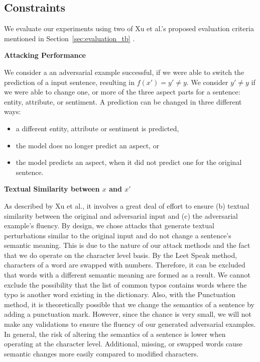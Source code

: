 \subsection{Constraints}
    \label{sec:constraints_m}

We evaluate our experiments using two of Xu et al.'s proposed evaluation criteria mentioned in Section~\ref{sec:evaluation_tb} \cite{xu2020elephant}. 

\textbf{Attacking Performance}

We consider a an adversarial example successful, if we were able to switch the prediction of a input sentence, resulting in ${f(x') = y' \neq y}$.
We consider ${y' \neq y}$ if we were able to change one, or more of the three aspect parts for a sentence: entity, attribute, or sentiment. 
A prediction can be changed in three different ways:
\begin{itemize}
\item a different entity, attribute or sentiment is predicted,
\item the model does no longer predict an aspect, or
\item the model predicts an aspect, when it did not predict one for the original sentence.
\end{itemize}

\textbf{Textual Similarity between $x$ and $x'$}

As described by Xu et al., it involves a great deal of effort to ensure (b) textual similarity between the original and adversarial input and (c) the adversarial example's fluency.
By design, we chose attacks that generate textual perturbations similar to the original input and do not change a sentence's semantic meaning. This is due to the nature of our attack methods and the fact that we do operate on the character level basis. By the Leet Speak method, characters of a word are swapped with numbers. Therefore, it can be excluded that words with a different semantic meaning are formed as a result. We cannot exclude the possibility that the list of common typos contains words where the typo is another word existing in the dictionary. 
Also, with the Punctuation method, it is theoretically possible that we change the semantics of a sentence by adding a punctuation mark. However, since the chance is very small, we will not make any validations to ensure the fluency of our generated adversarial examples.
In general, the risk of altering the semantics of a sentence is lower when operating at the character level. Additional, missing, or swapped words cause semantic changes more easily compared to modified characters. 



